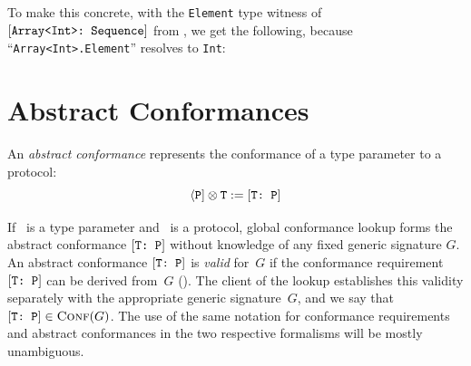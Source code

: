 \documentclass[../generics]{subfiles}
\begin{document}
To make this concrete, with the \texttt{Element} type witness of $[\texttt{Array<Int>:~Sequence}]$ from , we get the following, because ``\texttt{Array<Int>.Element}'' resolves to \texttt{Int}:
\begin{center}
\end{center}

\section{Abstract Conformances}\label{abstract conformances}

An \emph{abstract conformance} represents the conformance of a type parameter to a protocol:
\[\langle\texttt{P}]\otimes\texttt{T} := [\texttt{T:~P}]\]

If \tT\ is a type parameter and \tP\ is a protocol, global conformance lookup forms the abstract conformance $[\texttt{T:~P}]$ without knowledge of any fixed generic signature $G$. An abstract conformance $[\texttt{T:~P}]$ is \emph{valid} for~$G$ if the conformance requirement $[\texttt{T:~P}]$ can be derived from~$G$ (). The client of the lookup establishes this validity separately with the appropriate generic signature~$G$, and we say that $[\texttt{T:~P}] \in \textsc{Conf}({G})$. The use of the same notation for conformance requirements and abstract conformances in the two respective formalisms will be mostly unambiguous.
\end{document}
